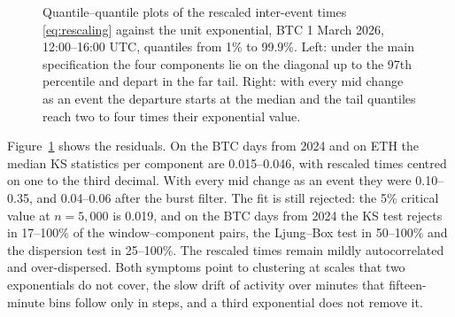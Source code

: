 \documentclass[a4paper,11pt]{article}
\begin{document}
\begin{figure}[htbp]
\centering
{}
\caption{Quantile--quantile plots of the rescaled inter-event times \eqref{eq:rescaling} against the unit exponential, BTC 1 March 2026, 12:00--16:00 UTC, quantiles from 1\% to 99.9\%. Left: under the main specification the four components lie on the diagonal up to the 97th percentile and depart in the far tail. Right: with every mid change as an event the departure starts at the median and the tail quantiles reach two to four times their exponential value.}
\label{fig:qq}
\end{figure}

Figure~\ref{fig:qq} shows the residuals. On the BTC days from 2024 and on ETH the median KS statistics per component are 0.015--0.046, with rescaled times centred on one to the third decimal. With every mid change as an event they were 0.10--0.35, and 0.04--0.06 after the burst filter. The fit is still rejected: the 5\% critical value at $n = 5{,}000$ is 0.019, and on the BTC days from 2024 the KS test rejects in 17--100\% of the window--component pairs, the Ljung--Box test in 50--100\% and the dispersion test in 25--100\%. The rescaled times remain mildly autocorrelated and over-dispersed. Both symptoms point to clustering at scales that two exponentials do not cover, the slow drift of activity over minutes that fifteen-minute bins follow only in steps, and a third exponential does not remove it.
\end{document}
